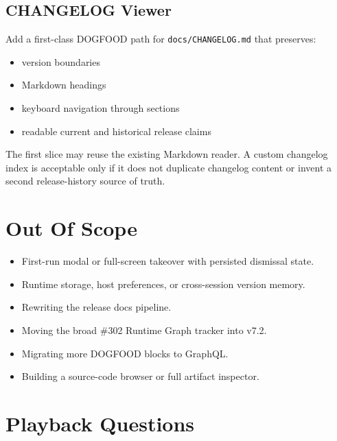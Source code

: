 \subsection{CHANGELOG Viewer}\label{record-118-changelog-viewer}

Add a first-class DOGFOOD path for \texttt{d\allowbreak{}o\allowbreak{}c\allowbreak{}s\allowbreak{}/\allowbreak{}C\allowbreak{}H\allowbreak{}A\allowbreak{}N\allowbreak{}G\allowbreak{}E\allowbreak{}L\allowbreak{}O\allowbreak{}G\allowbreak{}.\allowbreak{}m\allowbreak{}d} that preserves:

\begin{itemize}
\tightlist
\item
  version boundaries
\item
  Markdown headings
\item
  keyboard navigation through sections
\item
  readable current and historical release claims
\end{itemize}

The first slice may reuse the existing Markdown reader. A custom changelog index is acceptable only if it does not duplicate changelog content or invent a second release-history source of truth.

\section{Out Of Scope}\label{record-118-out-of-scope}

\begin{itemize}
\tightlist
\item
  First-run modal or full-screen takeover with persisted dismissal state.
\item
  Runtime storage, host preferences, or cross-session version memory.
\item
  Rewriting the release docs pipeline.
\item
  Moving the broad \#302 Runtime Graph tracker into v7.2.
\item
  Migrating more DOGFOOD blocks to GraphQL.
\item
  Building a source-code browser or full artifact inspector.
\end{itemize}

\section{Playback Questions}\label{record-118-playback-questions}


